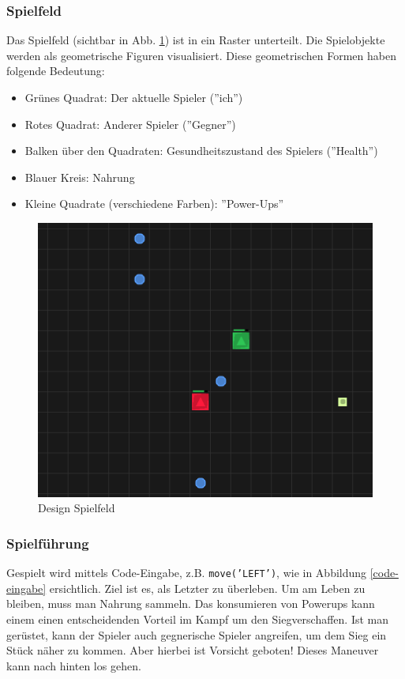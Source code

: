 \documentclass[11pt,a4paper,titlepage]{article}
\begin{document}
\subsubsection{Spielfeld}

Das Spielfeld (sichtbar in Abb. \ref{spielfeld}) ist in ein Raster unterteilt. Die Spielobjekte werden als geometrische Figuren visualisiert. Diese geometrischen Formen haben folgende Bedeutung:
\begin{itemize}
\item Grünes Quadrat: Der aktuelle Spieler (''ich'')
\item Rotes Quadrat: Anderer Spieler (''Gegner'')
\item Balken über den Quadraten: Gesundheitszustand des Spielers (''Health'')
\item Blauer Kreis: Nahrung
\item Kleine Quadrate (verschiedene Farben): ''Power-Ups''
\end{itemize}

\begin{figure}[H]
	\centering
	\includegraphics[width=\textwidth]{game1.png}
	\caption{Design Spielfeld}
	\label{spielfeld}
\end{figure}

\subsubsection{Spielführung}

Gespielt wird mittels Code-Eingabe, z.B. \texttt{move('LEFT')}, wie in Abbildung \ref{code-eingabe} ersichtlich. Ziel ist es, als Letzter zu überleben. Um am Leben zu bleiben, muss man Nahrung sammeln. Das konsumieren von Powerups kann einem einen entscheidenden Vorteil im Kampf um den Siegverschaffen. Ist man gerüstet, kann der Spieler auch gegnerische Spieler angreifen, um dem Sieg ein Stück näher zu kommen. Aber hierbei ist Vorsicht geboten! Dieses Maneuver kann nach hinten los gehen.
\end{document}

